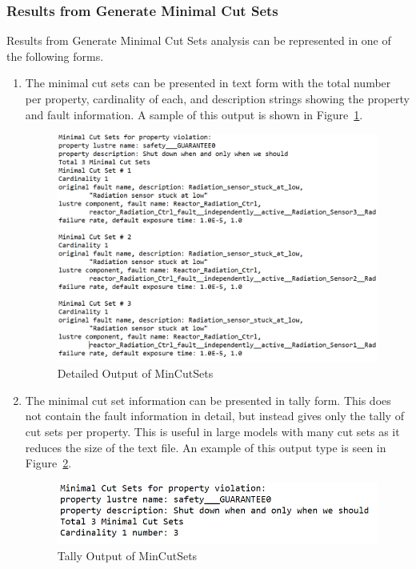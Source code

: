 \subsubsection{Results from Generate Minimal Cut Sets}
Results from Generate Minimal Cut Sets analysis can be represented in one of the following forms.
\begin{enumerate}
\item The minimal cut sets can be presented in text form with the total number per property, cardinality of each, and description strings showing the property and fault information. A sample of this output is shown in Figure~\ref{fig:detailedMCS}. 
\begin{figure}[h!]
	\hspace*{-2cm}
	\vspace{-0.1in} 
	\begin{center}
		\includegraphics[scale=0.7]{images/detailedMCS.png}
	\caption{Detailed Output of MinCutSets}
		\label{fig:detailedMCS}
	\end{center}
\end{figure}

\item The minimal cut set information can be presented in tally form. This does not contain the fault information in detail, but instead gives only the tally of cut sets per property. This is useful in large models with many cut sets as it reduces the size of the text file. An example of this output type is seen in Figure~\ref{fig:tallyMCS}.
\begin{figure}[h!]
	\hspace*{-2cm}
	\vspace{-0.1in} 
	\begin{center}
		\includegraphics[scale=0.7]{images/TallyMCS.png}
	\caption{Tally Output of MinCutSets}
		\label{fig:tallyMCS}
	\end{center}
\end{figure}


\end{enumerate}
